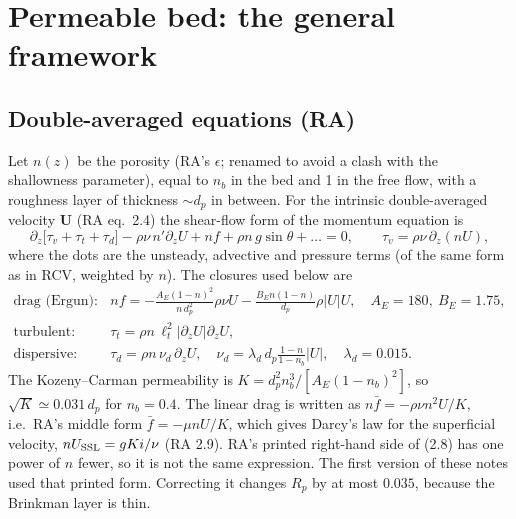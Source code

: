 \documentclass[10pt,a4paper]{article}
\newcommand{\bU}{\bm{U}}
\newcommand{\Rp}{R_p}
\begin{document}
\section{Permeable bed: the general framework}\label{sec:gen}
\subsection{Double-averaged equations (RA)}
Let $n(z)$ be the porosity (RA's $\epsilon$; renamed to avoid a clash with the shallowness parameter), equal to $n_b$ in the bed and 1 in the free flow, with a roughness layer of thickness $\sim d_p$ in between. For the intrinsic double-averaged velocity $\bU$ (RA eq.\ 2.4) the shear-flow form of the momentum equation is
\begin{equation}\label{eq:DANS}
\partial_z\big[\tau_v+\tau_t+\tau_d\big]-\rho\nu\,n'\partial_zU+n f+\rho n\,g\sin\theta+\ldots=0,\qquad \tau_v=\rho\nu\,\partial_z(nU),
\end{equation}
where the dots are the unsteady, advective and pressure terms (of the same form as in RCV, weighted by $n$). The closures used below are
\begin{align}
\text{drag (Ergun):}\quad & nf=-\frac{A_E(1-n)^2}{n\,d_p^2}\rho\nu U-\frac{B_En(1-n)}{d_p}\rho|U|U,\quad A_E=180,\ B_E=1.75,\\
\text{turbulent:}\quad & \tau_t=\rho n\,\ell_t^2|\partial_zU|\partial_zU,\\
\text{dispersive:}\quad & \tau_d=\rho n\,\nu_d\,\partial_zU,\quad \nu_d=\lambda_d\,d_p\frac{1-n}{1-n_b}|U|,\quad \lambda_d=0.015.
\end{align}
The Kozeny--Carman permeability is $K=d_p^2n_b^3/[A_E(1-n_b)^2]$, so $\sqrt K\simeq0.031\,d_p$ for $n_b=0.4$. The linear drag is written as $n\bar f=-\rho\nu n^2U/K$, i.e.\ RA's middle form $\bar f=-\mu nU/K$, which gives Darcy's law for the superficial velocity, $nU_{\rm SSL}=gKi/\nu$ (RA 2.9). RA's printed right-hand side of (2.8) has one power of $n$ fewer, so it is not the same expression. The first version of these notes used that printed form. Correcting it changes $\Rp$ by at most $0.035$, because the Brinkman layer is thin.
\end{document}
